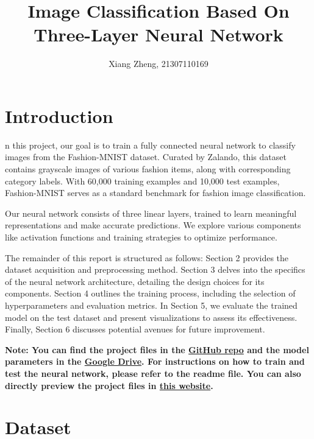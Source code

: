 \documentclass[10pt,a4paper,twoside]{tau}
\title{Image Classification Based On Three-Layer Neural Network}
\author[]{Xiang Zheng, 21307110169}
\affil[]{School of Data Science, Fudan University}
\date{}
\begin{document}
		
\maketitle
\thispagestyle{firststyle}
\tauabstract


\section{Introduction}

n this project, our goal is to train a fully connected neural network to classify images from the Fashion-MNIST dataset. Curated by Zalando, this dataset contains grayscale images of various fashion items, along with corresponding category labels. With 60,000 training examples and 10,000 test examples, Fashion-MNIST serves as a standard benchmark for fashion image classification.

Our neural network consists of three linear layers, trained to learn meaningful representations and make accurate predictions. We explore various components like activation functions and training strategies to optimize performance. 

The remainder of this report is structured as follows: Section 2 provides the dataset acquisition and preprocessing method. Section 3 delves into the specifics of the neural network architecture, detailing the design choices for its components. Section 4 outlines the training process, including the selection of hyperparameters and evaluation metrics. In Section 5, we evaluate the trained model on the test dataset and present visualizations to assess its effectiveness. Finally, Section 6 discusses potential avenues for future improvement. 

\textbf{Note: You can find the project files in the \href{https://github.com/mango7789/Computer-Vision-HW1}{GitHub repo} and the model parameters in the \href{https://drive.google.com/file/d/1fHbpA-FtWAH-j2v-awv-D9p3sIjMfqLW/view?usp=drive_link}{Google Drive}. For instructions on how to train and test the neural network, please refer to the readme file. You can also directly preview the project files in \href{https://github1s.com/mango7789/Computer-Vision-HW1}{this website}.}



\section{Dataset}
\end{document}
